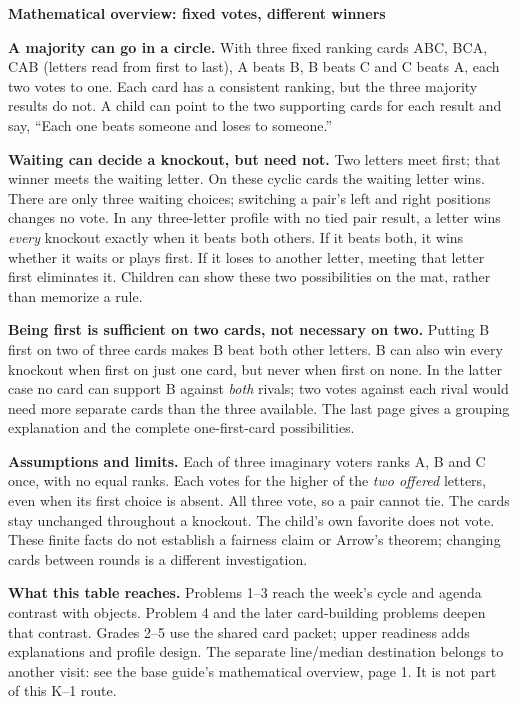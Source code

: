 \documentclass[11pt]{article}
\newcommand{\head}[1]{\par\textbf{\large #1}\par}
\begin{document}
\head{Mathematical overview: fixed votes, different winners}
\textbf{A majority can go in a circle.} With three fixed ranking cards ABC, BCA, CAB (letters read from first to last), A beats B, B beats C and C beats A, each two votes to one. Each card has a consistent ranking, but the three majority results do not. A child can point to the two supporting cards for each result and say, ``Each one beats someone and loses to someone.''

\textbf{Waiting can decide a knockout, but need not.} Two letters meet first; that winner meets the waiting letter. On these cyclic cards the waiting letter wins. There are only three waiting choices; switching a pair's left and right positions changes no vote. In any three-letter profile with no tied pair result, a letter wins \emph{every} knockout exactly when it beats both others. If it beats both, it wins whether it waits or plays first. If it loses to another letter, meeting that letter first eliminates it. Children can show these two possibilities on the mat, rather than memorize a rule.

\textbf{Being first is sufficient on two cards, not necessary on two.} Putting B first on two of three cards makes B beat both other letters. B can also win every knockout when first on just one card, but never when first on none. In the latter case no card can support B against \emph{both} rivals; two votes against each rival would need more separate cards than the three available. The last page gives a grouping explanation and the complete one-first-card possibilities.

\textbf{Assumptions and limits.} Each of three imaginary voters ranks A, B and C once, with no equal ranks. Each votes for the higher of the \emph{two offered} letters, even when its first choice is absent. All three vote, so a pair cannot tie. The cards stay unchanged throughout a knockout. The child's own favorite does not vote. These finite facts do not establish a fairness claim or Arrow's theorem; changing cards between rounds is a different investigation.

\textbf{What this table reaches.} Problems 1--3 reach the week's cycle and agenda contrast with objects. Problem 4 and the later card-building problems deepen that contrast. Grades 2--5 use the shared card packet; upper readiness adds explanations and profile design. The separate line/median destination belongs to another visit: see the base guide's mathematical overview, page 1. It is not part of this K--1 route.
\end{document}
